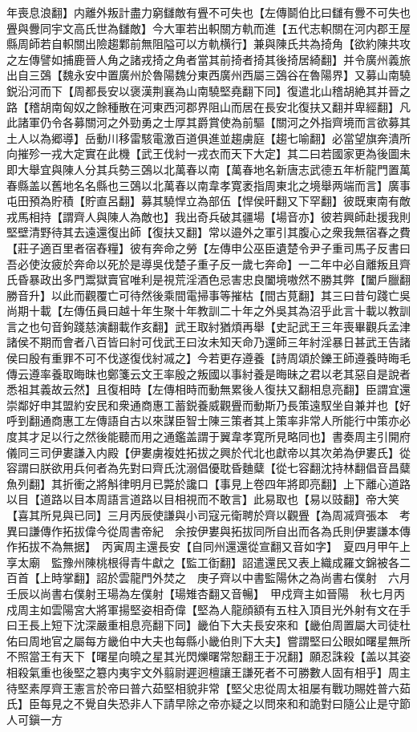 年喪息浪翻】内離外叛計盡力窮讎敵有舋不可失也【左傳鬬伯比曰讎有釁不可失也舋與釁同宇文高氏世為讎敵】今大軍若出軹關方軌而進【五代志軹關在河内郡王屋縣周師若自軹關出險趨鄴前無阻隘可以方軌横行】兼與陳氏共為掎角【欲約陳共攻之左傳譬如捕鹿晉人角之諸戎掎之角者當其前掎者掎其後掎居綺翻】并令廣州義旅出自三鵶【魏永安中置廣州於魯陽魏分東西廣州西屬三鵶谷在魯陽界】又募山南驍鋭沿河而下【周都長安以褒漢荆襄為山南驍堅堯翻下同】復遣北山稽胡絶其并晉之路【稽胡南匈奴之餘種散在河東西河郡界阻山而居在長安北復扶又翻并卑經翻】凡此諸軍仍令各募關河之外勁勇之士厚其爵賞使為前驅【關河之外指齊境而言欲募其土人以為郷導】岳動川移雷駭電激百道俱進並趨虜庭【趨七喻翻】必當望旗奔潰所向摧殄一戎大定實在此機【武王伐紂一戎衣而天下大定】其二曰若國家更為後圖未即大舉宜與陳人分其兵勢三鵶以北萬春以南【萬春地名新唐志武德五年析龍門置萬春縣盖以舊地名名縣也三鵶以北萬春以南韋孝寛袤指周東北之境舉两端而言】廣事屯田預為貯積【貯直呂翻】募其驍悍立為部伍【悍侯旰翻又下罕翻】彼既東南有敵戎馬相持【謂齊人與陳人為敵也】我出奇兵破其疆場【場音亦】彼若興師赴援我則堅壁清野待其去遠還復出師【復扶又翻】常以邉外之軍引其腹心之衆我無宿春之費【莊子適百里者宿舂糧】彼有奔命之勞【左傳申公巫臣遺楚令尹子重司馬子反書曰吾必使汝疲於奔命以死於是導吳伐楚子重子反一歲七奔命】一二年中必自離叛且齊氏昏暴政出多門鬻獄賣官唯利是視荒淫酒色忌害忠良闔境嗷然不勝其弊【闔戶臘翻勝音升】以此而觀覆亡可待然後乘間電掃事等摧枯【間古莧翻】其三曰昔句踐亡吳尚期十載【左傳伍員曰越十年生聚十年教訓二十年之外吳其為沼乎此言十載以教訓言之也句音鉤踐慈演翻載作亥翻】武王取紂猶煩再舉【史記武王三年喪畢觀兵孟津諸侯不期而會者八百皆曰紂可伐武王曰汝未知天命乃還師三年紂淫暴日甚武王告諸侯曰殷有重罪不可不伐遂復伐紂㓕之】今若更存遵養【詩周頌於鑠王師遵養時晦毛傳云遵率養取晦昩也鄭箋云文王率殷之叛國以事紂養是晦昧之君以老其惡自是說者悉祖其義故云然】且復相時【左傳相時而動無累後人復扶又翻相息亮翻】臣謂宜還崇鄰好申其盟約安民和衆通商惠工蓄鋭養威觀舋而動斯乃長策遠馭坐自兼并也【好呼到翻通商惠工左傳語自古以來謀臣智士陳三策者其上策率非常人所能行中策亦必度其才足以行之然後能聽而用之通鑑盖謂于翼韋孝寛所見略同也】書奏周主引開府儀同三司伊婁謙入内殿【伊婁虜複姓拓拔之興於代北也獻帝以其次弟為伊婁氏】從容謂曰朕欲用兵何者為先對曰齊氏沈溺倡優耽昏麯糵【從七容翻沈持林翻倡音昌糵魚列翻】其折衝之將斛律明月已斃於讒口【事見上卷四年將即亮翻】上下離心道路以目【道路以目本周語言道路以目相視而不敢言】此易取也【易以豉翻】帝大笑【喜其所見與已同】三月丙辰使謙與小司寇元衛聘於齊以觀舋【為周㓕齊張本　考異曰謙傳作拓拔偉今從周書帝紀　余按伊婁與拓拔同所自出而各為氏則伊婁謙本傳作拓拔不為無据】　丙寅周主還長安【自同州還還從宣翻又音如字】　夏四月甲午上享太廟　監豫州陳桃根得青牛獻之【監工衘翻】詔遣還民又表上織成羅文錦被各二百首【上時掌翻】詔於雲龍門外焚之　庚子齊以中書監陽休之為尚書右僕射　六月壬辰以尚書右僕射王瑒為左僕射【瑒雉杏翻又音暢】　甲戍齊主如晉陽　秋七月丙戍周主如雲陽宮大將軍揚堅姿相奇偉【堅為人龍顔額有五柱入頂目光外射有文在手曰王長上短下沈深嚴重相息亮翻下同】畿伯下大夫長安來和【畿伯周置屬大司徒杜佑曰周地官之屬每方畿伯中大夫也每縣小畿伯則下大夫】嘗謂堅曰公眼如曙星無所不照當王有天下【曙星向曉之星其光閃爍曙常恕翻王于况翻】願忍誅殺【盖以其姿相殺氣重也後堅之簒内夷宇文外翦尉遲迥檀讓王謙死者不可勝數人固有相乎】周主待堅素厚齊王憲言於帝曰普六茹堅相貌非常【堅父忠從周太祖屡有戰功賜姓普六茹氏】臣每見之不覺自失恐非人下請早除之帝亦疑之以問來和和詭對曰隨公止是守節人可鎭一方